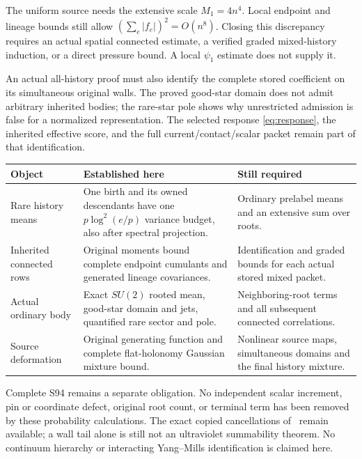 \documentclass[11pt,letterpaper]{article}
\theoremstyle{remark}\newtheorem{remark}[theorem]{Remark}
\begin{document}
The uniform source needs the extensive scale \(M_1=4n^4\). Local endpoint and lineage bounds still allow \((\sum_e|f_e|)^2=O(n^8)\). Closing this discrepancy requires an actual spatial connected estimate, a verified graded mixed-history induction, or a direct pressure bound. A local \(\psi_1\) estimate does not supply it.

An actual all-history proof must also identify the complete stored coefficient on its simultaneous original walls. The proved good-star domain does not admit arbitrary inherited bodies; the rare-star pole shows why unrestricted admission is false for a normalized representation. The selected response \eqref{eq:response}, the inherited effective score, and the full current/contact/scalar packet remain part of that identification.

\begin{center}
\small
\begin{tabular}{@{}>{\raggedright\arraybackslash}p{.21\linewidth}
>{\raggedright\arraybackslash}p{.36\linewidth}
>{\raggedright\arraybackslash}p{.37\linewidth}@{}}
\toprule
Object & Established here & Still required\\
\midrule
Rare history means &
One birth and its owned descendants have one \(p\log^2(e/p)\) variance budget, also after spectral projection. &
Ordinary prelabel means and an extensive sum over roots.\\[4pt]
Inherited connected rows &
Original moments bound complete endpoint cumulants and generated lineage covariances. &
Identification and graded bounds for each actual stored mixed packet.\\[4pt]
Actual ordinary body &
Exact \(SU(2)\) rooted mean, good-star domain and jets, quantified rare sector and pole. &
Neighboring-root terms and all subsequent connected correlations.\\[4pt]
Source deformation &
Original generating function and complete flat-holonomy Gaussian mixture bound. &
Nonlinear source maps, simultaneous domains and the final history mixture.\\
\bottomrule
\end{tabular}
\end{center}

Complete S94 remains a separate obligation. No independent scalar increment, pin or coordinate defect, original root count, or terminal term has been removed by these probability calculations. The exact copied cancellations of~\cite[\S8]{OS} remain available; a wall tail alone is still not an ultraviolet summability theorem. No continuum hierarchy or interacting Yang--Mills identification is claimed here.
\end{document}
